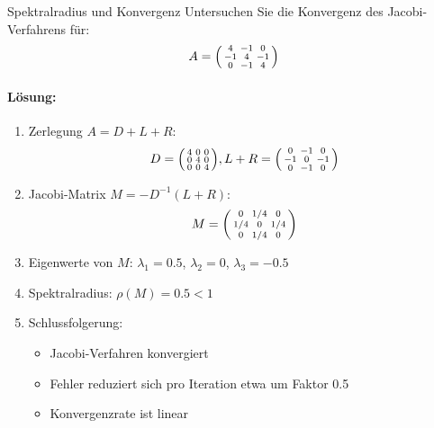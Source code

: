 \begin{example2}{Spektralradius und Konvergenz}
Untersuchen Sie die Konvergenz des Jacobi-Verfahrens für:
$$A = \begin{psmallmatrix}
4 & -1 & 0 \\
-1 & 4 & -1 \\
0 & -1 & 4
\end{psmallmatrix}$$

\paragraph{Lösung:}
\begin{enumerate}
    \item Zerlegung $A = D + L + R$:
    $$D = \begin{psmallmatrix}
    4 & 0 & 0 \\
    0 & 4 & 0 \\
    0 & 0 & 4
    \end{psmallmatrix}, L+R = \begin{psmallmatrix}
    0 & -1 & 0 \\
    -1 & 0 & -1 \\
    0 & -1 & 0
    \end{psmallmatrix}$$
    
    \item Jacobi-Matrix $M = -D^{-1}(L+R)$:
    $$M = \begin{psmallmatrix}
    0 & 1/4 & 0 \\
    1/4 & 0 & 1/4 \\
    0 & 1/4 & 0
    \end{psmallmatrix}$$
    
    \item Eigenwerte von $M$: $\lambda_1 = 0.5$, $\lambda_2 = 0$, $\lambda_3 = -0.5$
    
    \item Spektralradius: $\rho(M) = 0.5 < 1$
    
    \item Schlussfolgerung:
    \begin{itemize}
        \item Jacobi-Verfahren konvergiert
        \item Fehler reduziert sich pro Iteration etwa um Faktor 0.5
        \item Konvergenzrate ist linear
    \end{itemize}
\end{enumerate}
\end{example2}






